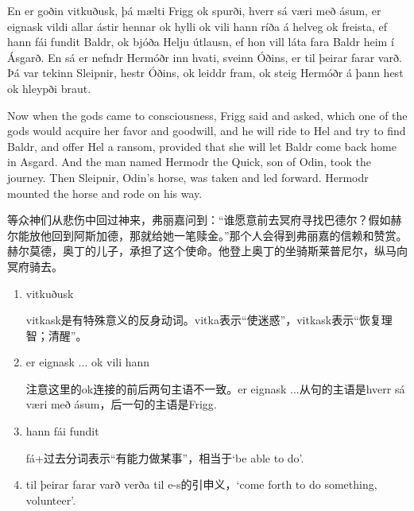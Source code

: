 \begin{paracol}{2}
    En er goðin vitkuðusk, þá mælti Frigg ok spurði, hverr sá væri með ásum, er eignask vildi allar ástir hennar ok hylli ok vili hann ríða á helveg ok freista, ef hann fái fundit Baldr, ok bjóða Helju útlausn, ef hon vill láta fara Baldr heim í Ásgarð. En sá er nefndr Hermóðr inn hvati, sveinn Óðins, er til þeirar farar varð. Þá var tekinn Sleipnir, hestr Óðins, ok leiddr fram, ok steig Hermóðr á þann hest ok hleypði braut.
    \switchcolumn

    Now when the gods came to consciousness, Frigg said and asked, which one of the gods would acquire her favor and goodwill, and he will ride to Hel and try to find Baldr, and offer Hel a ransom, provided that she will let Baldr come back home in Asgard. And the man named Hermodr the Quick, son of Odin, took the journey. Then Sleipnir, Odin's horse, was taken and led forward. Hermodr mounted the horse and rode on his way.
\end{paracol}
\begin{translation*}{}
    等众神们从悲伤中回过神来，弗丽嘉问到：“谁愿意前去冥府寻找巴德尔？假如赫尔能放他回到阿斯加德，那就给她一笔赎金。”那个人会得到弗丽嘉的信赖和赞赏。赫尔莫德，奥丁的儿子，承担了这个使命。他登上奥丁的坐骑斯莱普尼尔，纵马向冥府骑去。
\end{translation*}
\begin{grammar*}{}
    \begin{enumerate}[leftmargin=*]
        \item vitkuðusk

              vitkask是有特殊意义的反身动词。vitka表示“使迷惑”，vitkask表示“恢复理智；清醒”。

        \item er eignask ... ok vili hann

              注意这里的ok连接的前后两句主语不一致。er eignask ...从句的主语是hverr sá væri með ásum，后一句的主语是Frigg.

        \item hann fái fundit

              fá+过去分词表示“有能力做某事”，相当于`be able to do'.

        \item til þeirar farar varð
              verða til e-s的引申义，`come forth to do something, volunteer'.
    \end{enumerate}
\end{grammar*}
\hspace*{\fill}\\
